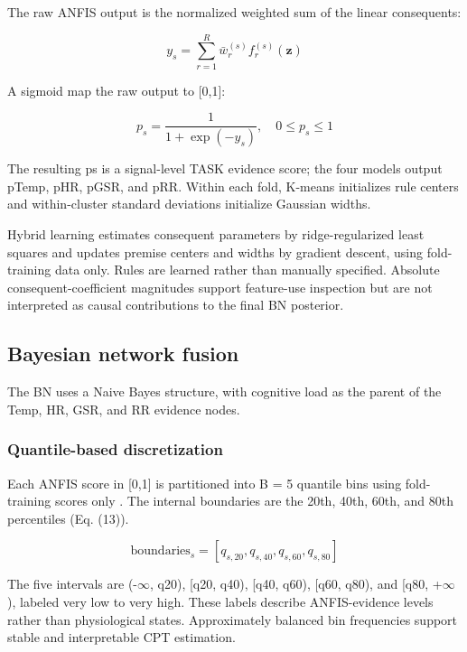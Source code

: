 \documentclass[runningheads]{llncs}
\begin{document}
The raw ANFIS output is the normalized weighted sum of the linear consequents:

\begin{equation}y_s=\sum_{r=1}^{R}\bar{w}_r^{(s)}f_r^{(s)}(\mathbf z)\tag{11}\end{equation}

A sigmoid map the raw output to [0,1]:

\begin{equation}p_s=\frac{1}{1+\exp(-y_s)},\quad 0\le p_s\le1\tag{12}\end{equation}

The resulting ps is a signal-level TASK evidence score; the four models output pTemp, pHR, pGSR, and pRR. Within each fold, K-means initializes rule centers and within-cluster standard deviations initialize Gaussian widths.

Hybrid learning estimates consequent parameters by ridge-regularized least squares and updates premise centers and widths by gradient descent, using fold-training data only. Rules are learned rather than manually specified. Absolute consequent-coefficient magnitudes support feature-use inspection but are not interpreted as causal contributions to the final BN posterior.

\subsection{Bayesian network fusion}

The BN uses a Naive Bayes structure, with cognitive load as the parent of the Temp, HR, GSR, and RR evidence nodes.

\subsubsection{Quantile-based discretization}

Each ANFIS score in [0,1] is partitioned into B = 5 quantile bins using fold-training scores only \cite{ref20}. The internal boundaries are the 20th, 40th, 60th, and 80th percentiles (Eq. (13)).

\begin{equation}\mathrm{boundaries}_s=[q_{s,20},q_{s,40},q_{s,60},q_{s,80}]\tag{13}\end{equation}

The five intervals are (-$\infty$, q20), [q20, q40), [q40, q60), [q60, q80), and [q80, +$\infty$), labeled very low to very high. These labels describe ANFIS-evidence levels rather than physiological states. Approximately balanced bin frequencies support stable and interpretable CPT estimation.
\end{document}
